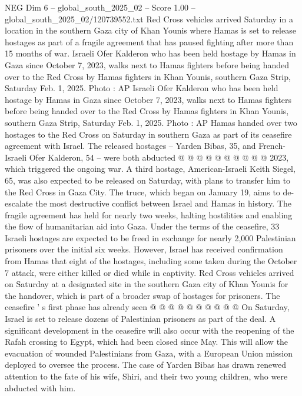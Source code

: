 \begin{textsample}{NEG Dim 6 – global\_south\_2025\_02 – Score 1.00 – global\_south\_2025\_02/120739552.txt}  \label{ex:f6_neg_043}
Red Cross vehicles arrived Saturday in a location in the southern Gaza city of Khan Younis where Hamas is set to release hostages as part of a fragile agreement that has paused fighting after more than 15 months of war.
Israeli Ofer Kalderon who has been held hostage by Hamas in Gaza since October 7, 2023, walks next to Hamas fighters before being handed over to the Red Cross by Hamas fighters in Khan Younis, southern Gaza Strip, Saturday Feb. 1, 2025.
Photo : AP Israeli Ofer Kalderon who has been held hostage by Hamas in Gaza since October 7, 2023, walks next to Hamas fighters before being handed over to the Red Cross by Hamas fighters in Khan Younis, southern Gaza Strip, Saturday Feb. 1, 2025.
Photo : AP Hamas handed over two hostages to the Red Cross on Saturday in southern Gaza as part of its ceasefire agreement with Israel.
The released hostages -- Yarden Bibas, 35, and French-Israeli Ofer Kalderon, 54 -- were both abducted @ @ @ @ @ @ @ @ @ @ 2023, which triggered the ongoing war.
A third hostage, American-Israeli Keith Siegel, 65, was also expected to be released on Saturday, with plans to transfer him to the Red Cross in Gaza City.
The truce, which began on January 19, aims to de-escalate the most destructive conflict between Israel and Hamas in history.
The fragile agreement has held for nearly two weeks, halting hostilities and enabling the flow of humanitarian aid into Gaza.
Under the terms of the ceasefire, 33 Israeli hostages are expected to be freed in exchange for nearly 2,000 Palestinian prisoners over the initial six weeks.
However, Israel has received confirmation from Hamas that eight of the hostages, including some taken during the October 7 attack, were either killed or died while in captivity.
Red Cross vehicles arrived on Saturday at a designated site in the southern Gaza city of Khan Younis for the handover, which is part of a broader swap of hostages for prisoners.
The ceasefire ' s first phase has already seen @ @ @ @ @ @ @ @ @ @ On Saturday, Israel is set to release dozens of Palestinian prisoners as part of the deal.
A significant development in the ceasefire will also occur with the reopening of the Rafah crossing to Egypt, which had been closed since May.
This will allow the evacuation of wounded Palestinians from Gaza, with a European Union mission deployed to oversee the process.
The case of Yarden Bibas has drawn renewed attention to the fate of his wife, Shiri, and their two young children, who were abducted with him.

\end{textsample}
